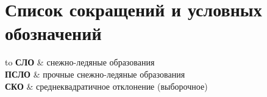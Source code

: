 \chapter*{Список сокращений и условных обозначений}             %
\noindent
\addtocounter{table}{-1}%
\begin{longtabu} to \textwidth {r X}
	\textbf{СЛО}	& снежно-ледяные образования\\
	\textbf{ПСЛО}	& прочные снежно-ледяные образования\\
	\textbf{СКО}	& среднеквадратичное отклонение (выборочное)
\end{longtabu}
